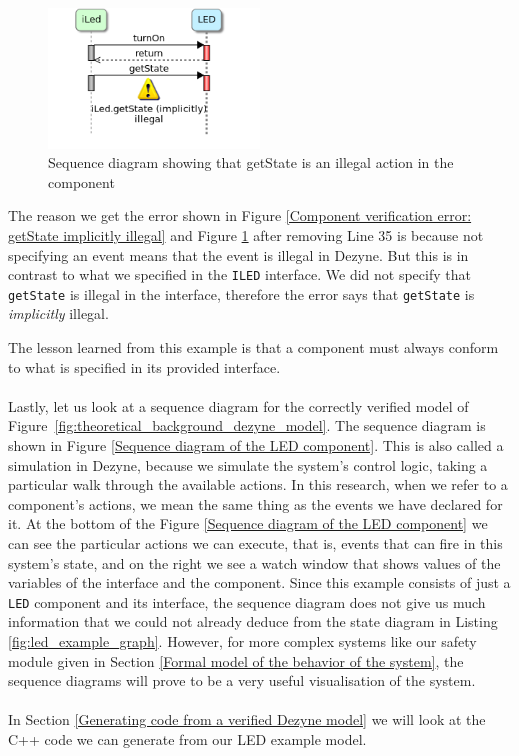\documentclass[12pt]{scrreprt}
\begin{document}
\begin{figure}[H]
    \centering
    \includegraphics[width=0.5\textwidth]{Figures/theoretical_background/getState_implicitly_illegal.png}
    \caption{Sequence diagram showing that getState is an illegal action in the component}
    \label{Sequence diagram showing that the component does not conform to the interface}
\end{figure}

The reason we get the error shown in Figure \ref{Component verification error: getState implicitly illegal} and Figure \ref{Sequence diagram showing that the component does not conform to the interface} after removing Line 35 is because not specifying an event means that the event is illegal in Dezyne. But this is in contrast to what we specified in the \texttt{ILED} interface. We did not specify that \texttt{getState} is illegal in the interface, therefore the error says that \texttt{getState} is \textit{implicitly} illegal.
\par
The lesson learned from this example is that a component must always conform to what is specified in its provided interface.
\\\\
Lastly, let us look at a sequence diagram for the correctly verified model of Figure~\ref{fig:theoretical_background_dezyne_model}. The sequence diagram is shown in Figure \ref{Sequence diagram of the LED component}. This is also called a simulation in Dezyne, because we simulate the system's control logic, taking a particular walk through the available actions. In this research, when we refer to a component's actions, we mean the same thing as the events we have declared for it. At the bottom of the Figure \ref{Sequence diagram of the LED component} we can see the particular actions we can execute, that is, events that can fire in this system's state, and on the right we see a watch window that shows values of the variables of the interface and the component. Since this example consists of just a \texttt{LED} component and its interface, the sequence diagram does not give us much information that we could not already deduce from the state diagram in Listing \ref{fig:led_example_graph}. However, for more complex systems like our safety module given in Section \ref{Formal model of the behavior of the system}, the sequence diagrams will prove to be a very useful visualisation of the system.
\\\\
In Section \ref{Generating code from a verified Dezyne model} we will look at the C++ code we can generate from our LED example model.
\end{document}
